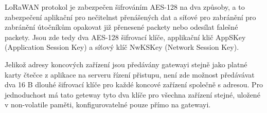 LoRaWAN protokol je zabezpečen šifrováním AES-128 na dva způsoby, a to zabezpečení aplikační pro nečitelnst přenášených dat a síťové pro zabránění pro zabránění útočníkům opakovat již přenesené packety nebo odesílat falešné packety. Jsou zde tedy dva AES-128 šifrovací klíče, applikační klič AppSKey (Application Session Key) a síťový klíč NwKSKey (Network Session Key).

Jelikož adresy koncových zařízení jsou předávány gatewayi stejně jako platné karty čtečce z aplikace na serveru řízení přistupu, není zde možnost předávávat dva 16 B dlouhé šifrovací klíče pro každé koncové zařízení společně s adresou.
Pro jednoduchost má tato geteway tyto dva klíče pro všechna zařízení stejné, uložené v non-volatile paměti, konfigurovatelné pouze přímo na gatewayi.













